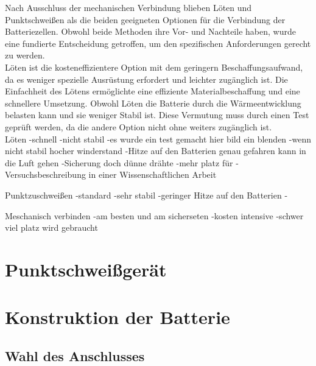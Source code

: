 Nach Ausschluss der mechanischen Verbindung blieben Löten und Punktschweißen als die beiden geeigneten Optionen für die Verbindung der Batteriezellen. Obwohl beide Methoden ihre Vor- und Nachteile haben, wurde eine fundierte Entscheidung getroffen, um den spezifischen Anforderungen gerecht zu werden.\\

Löten ist die kosteneffizientere Option mit dem geringern Beschaffungsaufwand, da es weniger spezielle Ausrüstung erfordert und leichter zugänglich ist. Die Einfachheit des Lötens ermöglichte eine effiziente Materialbeschaffung und eine schnellere Umsetzung. Obwohl Löten die Batterie durch die Wärmeentwicklung belasten kann und sie weniger Stabil ist. Diese Vermutung muss durch einen Test geprüft werden, da die andere Option nicht ohne weiters zugänglich ist.\\

Löten 
-schnell
-nicht stabil
-es wurde ein test gemacht hier bild ein blenden
-wenn nicht stabil hocher winderstand
-Hitze auf den Batterien genau gefahren kann in die Luft gehen
-Sicherung doch dünne drähte
-mehr platz für 
-Versuchsbeschreibung in einer Wissenschaftlichen Arbeit

Punktzuschweißen
-standard
-sehr stabil
-geringer Hitze auf den Batterien
-

Meschanisch verbinden
-am besten und am sicherseten
-kosten intensive
-schwer viel platz wird gebraucht
\section{Punktschweißgerät}









\section{Konstruktion der Batterie}

\subsection{Wahl des Anschlusses}
